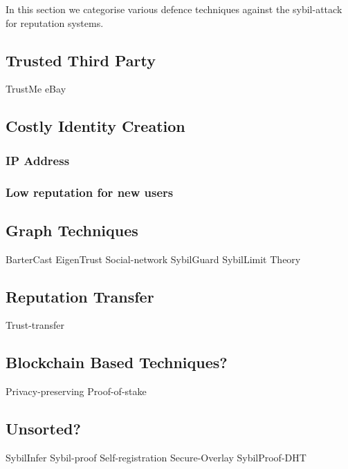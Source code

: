 In this section we categorise various defence techniques against the
sybil-attack for reputation systems.

\subsection{Trusted Third Party}\label{sec:trusted_party}
TrustMe\cite{singh2003trustme}
eBay\cite{resnick2002trust}

\subsection{Costly Identity Creation}\label{sec:costly_id}
\subsubsection{IP Address}
\subsubsection{Low reputation for new users}

\subsection{Graph Techniques}\label{sec:graph}
BarterCast\cite{meulpolder2009bartercast}
EigenTrust\cite{kamvar2003eigentrust}
Social-network\cite{viswanath2010analysis}
SybilGuard\cite{yu2006sybilguard}
SybilLimit\cite{yu2008sybillimit}
Theory\cite{seuken2011sybil}

\subsection{Reputation Transfer}
Trust-transfer\cite{seigneur2005trust}

\subsection{Blockchain Based Techniques?}
Privacy-preserving\cite{schaub2016trustless}
Proof-of-stake\cite{dennis2016rep}

\subsection{Unsorted?}
SybilInfer\cite{danezis2009sybilinfer}
Sybil-proof\cite{cheng2005sybilproof}
Self-registration\cite{dinger2006defending}
Secure-Overlay\cite{lua2007securing}
SybilProof-DHT\cite{lesniewski2010whanau}


